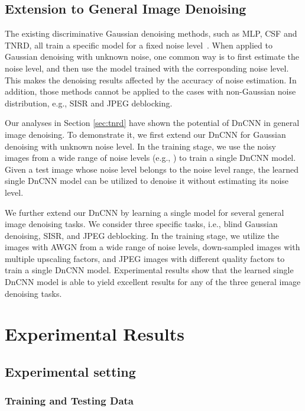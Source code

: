 \documentclass[journal]{IEEEtran}
\begin{document}
\subsection{Extension to General Image Denoising}

The existing discriminative Gaussian denoising methods, such as MLP, CSF and TNRD, all train a specific model for a fixed noise level~\cite{chen2015trainable,burger2012image}. When applied to Gaussian denoising with unknown noise, one common way is to first estimate the noise level, and then use the model trained with the corresponding noise level. This makes the denoising results affected by the accuracy of noise estimation. In addition, those methods cannot be applied to the cases with {non-Gaussian noise distribution}, e.g., SISR and JPEG deblocking.

Our analyses in Section \ref{sec:tnrd} have shown the potential of DnCNN in general image denoising. To demonstrate it, we first extend our DnCNN for Gaussian denoising with unknown noise level. In the training stage, we use the noisy images from a wide range of noise levels (e.g., ) to train a single DnCNN model. Given a test image whose noise level belongs to the noise level range, the learned single DnCNN model can be utilized to denoise it without estimating its noise level.

We further extend our DnCNN by learning a single model for {several general image denoising tasks}. We consider three specific tasks, i.e., blind Gaussian denoising, SISR, and JPEG deblocking. In the training stage, we utilize the images with AWGN from a wide range of noise levels, down-sampled images with multiple upscaling factors, and JPEG images with different quality factors to train a single DnCNN model. Experimental results show that the learned single DnCNN model is able to yield excellent results for any of the {three general image denoising tasks}.



\section{Experimental Results}\label{sec:experiment}
\label{sec:blind}


\subsection{Experimental setting}




\subsubsection{Training and Testing Data}
\end{document}
